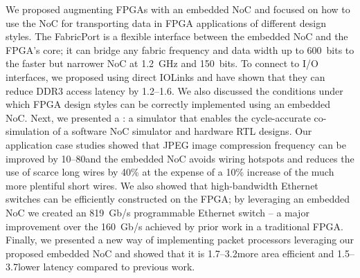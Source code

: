%
%

We proposed augmenting FPGAs with an embedded NoC and focused on how to use the NoC for transporting data in FPGA applications of different design styles.
The FabricPort is a flexible interface between the embedded NoC and the FPGA's core; it can bridge any fabric frequency and data width up to 600~bits to the faster but narrower NoC at 1.2~GHz and 150~bits.
To connect to I/O interfaces, we proposed using direct IOLinks and have shown that they can reduce DDR3 access latency by 1.2--1.6\xx.
We also discussed the conditions under which FPGA design styles can be correctly implemented using an embedded NoC.
Next, we presented a \rtlbook: a simulator that enables the cycle-accurate co-simulation of a software NoC simulator and hardware RTL designs.
Our application case studies showed that JPEG image compression frequency can be improved by 10--80\xx and the embedded NoC avoids wiring hotspots and reduces the use of scarce long wires by 40\% at the expense of a 10\% increase of the much more plentiful short wires.
We also showed that high-bandwidth Ethernet switches can be efficiently constructed on the FPGA; by leveraging an embedded NoC we created an 819~Gb/s programmable Ethernet switch -- a major improvement over the 160~Gb/s achieved by prior work in a traditional FPGA.
Finally, we presented a new way of implementing packet processors leveraging our proposed embedded NoC and showed that it is 1.7--3.2\xx more area efficient and 1.5--3.7\xx lower latency compared to previous work.
%
%
